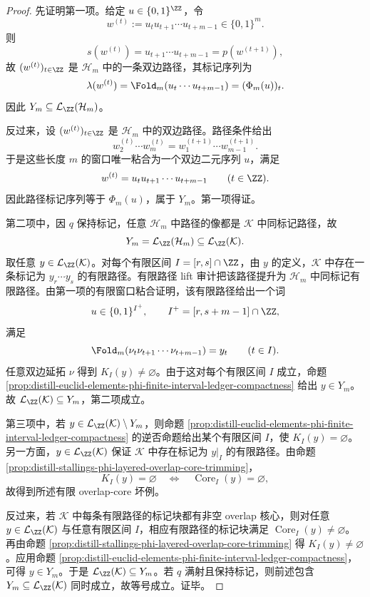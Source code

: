 \begin{proof}
先证明第一项。给定 \(u\in\{0,1\}^{\ZZ}\)，令
\[
w^{(t)}:=u_tu_{t+1}\cdots u_{t+m-1}\in\{0,1\}^m.
\]
则
\[
s(w^{(t)})=u_{t+1}\cdots u_{t+m-1}=p(w^{(t+1)}),
\]
故 \((w^{(t)})_{t\in\ZZ}\) 是 \(\mathcal H_m\) 中的一条双边路径，其标记序列为
\[
\lambda(w^{(t)})=\Fold_m(u_t\cdots u_{t+m-1})=(\Phi_m(u))_t.
\]
因此 \(Y_m\subseteq\mathcal L_{\ZZ}(\mathcal H_m)\)。

反过来，设 \((w^{(t)})_{t\in\ZZ}\) 是 \(\mathcal H_m\) 中的双边路径。路径条件给出
\[
w^{(t)}_2\cdots w^{(t)}_m=w^{(t+1)}_1\cdots w^{(t+1)}_{m-1}.
\]
于是这些长度 \(m\) 的窗口唯一粘合为一个双边二元序列 \(u\)，满足
\[
w^{(t)}=u_tu_{t+1}\cdots u_{t+m-1}
\qquad(t\in\ZZ).
\]
因此路径标记序列等于 \(\Phi_m(u)\)，属于 \(Y_m\)。第一项得证。

第二项中，因 \(q\) 保持标记，任意 \(\mathcal H_m\) 中路径的像都是 \(\mathcal K\) 中同标记路径，故
\[
Y_m=\mathcal L_{\ZZ}(\mathcal H_m)\subseteq\mathcal L_{\ZZ}(\mathcal K).
\]
取任意 \(y\in\mathcal L_{\ZZ}(\mathcal K)\)。对每个有限区间 \(I=[r,s]\cap\ZZ\)，由 \(y\) 的定义，\(\mathcal K\) 中存在一条标记为 \(y_r\cdots y_s\) 的有限路径。有限路径 lift 审计把该路径提升为 \(\mathcal H_m\) 中同标记有限路径。由第一项的有限窗口粘合证明，该有限路径给出一个词
\[
u\in\{0,1\}^{I^+},\qquad I^+=[r,s+m-1]\cap\ZZ,
\]
满足
\[
\Fold_m(\nu_t\nu_{t+1}\cdots\nu_{t+m-1})=y_t
\qquad(t\in I).
\]
任意双边延拓 \(\nu\) 得到 \(K_I(y)\ne\varnothing\)。由于这对每个有限区间 \(I\) 成立，命题 \ref{prop:distill-euclid-elements-phi-finite-interval-ledger-compactness} 给出 \(y\in Y_m\)。故 \(\mathcal L_{\ZZ}(\mathcal K)\subseteq Y_m\)，第二项成立。

第三项中，若 \(y\in\mathcal L_{\ZZ}(\mathcal K)\setminus Y_m\)，则命题 \ref{prop:distill-euclid-elements-phi-finite-interval-ledger-compactness} 的逆否命题给出某个有限区间 \(I\)，使
\(K_I(y)=\varnothing\)。另一方面，\(y\in\mathcal L_{\ZZ}(\mathcal K)\) 保证 \(\mathcal K\) 中存在标记为 \(y|_I\) 的有限路径。由命题 \ref{prop:distill-stallings-phi-layered-overlap-core-trimming}，
\[
K_I(y)=\varnothing
\quad\Longleftrightarrow\quad
\operatorname{Core}_I(y)=\varnothing,
\]
故得到所述有限 overlap-core 坏例。

反过来，若 \(\mathcal K\) 中每条有限路径的标记块都有非空 overlap 核心，则对任意
\(y\in\mathcal L_{\ZZ}(\mathcal K)\) 与任意有限区间 \(I\)，相应有限路径的标记块满足
\(\operatorname{Core}_I(y)\ne\varnothing\)。再由命题 \ref{prop:distill-stallings-phi-layered-overlap-core-trimming} 得
\(K_I(y)\ne\varnothing\)。应用命题 \ref{prop:distill-euclid-elements-phi-finite-interval-ledger-compactness}，可得
\(y\in Y_m\)。于是 \(\mathcal L_{\ZZ}(\mathcal K)\subseteq Y_m\)。若 \(q\) 满射且保持标记，则前述包含
\(Y_m\subseteq\mathcal L_{\ZZ}(\mathcal K)\) 同时成立，故等号成立。证毕。
\end{proof}

